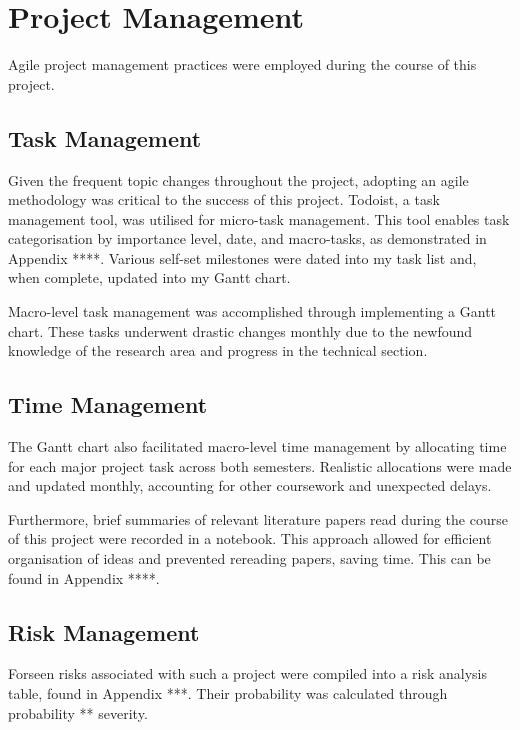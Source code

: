 

\section {Project Management}

Agile project management practices were employed during the course of this project. 

\subsection{Task Management}

Given the frequent topic changes throughout the project, adopting an agile methodology was critical to the success of this project. Todoist, a task management tool, was utilised for micro-task management. This tool enables task categorisation by importance level, date, and macro-tasks,  as demonstrated in Appendix ****. Various self-set milestones were dated into my task list and, when complete, updated into my Gantt chart.

Macro-level task management was accomplished through implementing a Gantt chart. These tasks underwent drastic changes monthly due to the newfound knowledge of the research area and progress in the technical section. 

\subsection{Time Management}

The Gantt chart also facilitated macro-level time management by allocating time for each major project task across both semesters. Realistic allocations were made and updated monthly, accounting for other coursework and unexpected delays. 

Furthermore, brief summaries of relevant literature papers read during the course of this project were recorded in a notebook. This approach allowed for efficient organisation of ideas and prevented rereading papers, saving time. This can be found in Appendix ****.

\subsection{Risk Management}

Forseen risks associated with such a project were compiled into a risk analysis table, found in Appendix ***. Their probability was calculated through probability ** severity.

